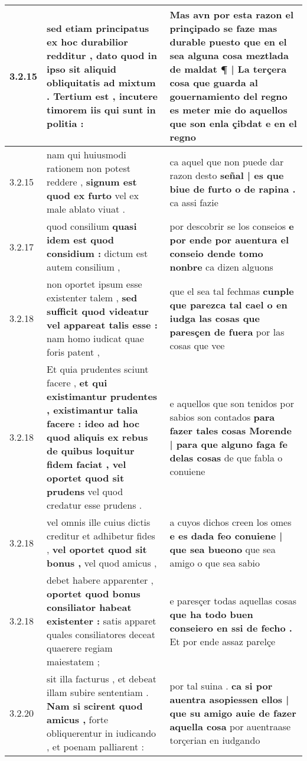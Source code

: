 \begin{tabular}{|p{1cm}|p{6.5cm}|p{6.5cm}|}
3.2.15 & sed etiam principatus ex hoc durabilior redditur , \textbf{ dato quod in ipso sit aliquid obliquitatis ad mixtum . Tertium est , } incutere timorem iis qui sunt in politia : & Mas avn por esta razon el prinçipado se faze mas durable \textbf{ puesto que en el sea alguna cosa meztlada de maldat ¶ | La terçera cosa } que guarda al gouernamiento del regno es meter mie do aquellos que son enla çibdat e en el regno \\\hline
3.2.15 & nam qui huiusmodi rationem non potest reddere , \textbf{ signum est quod ex furto } vel ex male ablato viuat . & ca aquel que non puede dar razon desto \textbf{ señal | es que biue de furto o de rapina . } ca assi fazie \\\hline
3.2.17 & quod consilium \textbf{ quasi idem est quod considium : } dictum est autem consilium , & por descobrir se los conseios \textbf{ e por ende por auentura el conseio dende tomo nonbre } ca dizen alguons \\\hline
3.2.18 & non oportet ipsum esse existenter talem , \textbf{ sed sufficit quod videatur vel appareat talis esse : } nam homo iudicat quae foris patent , & que el sea tal fechmas \textbf{ cunple que parezca tal cael o en iudga las cosas que paresçen de fuera } por las cosas que vee \\\hline
3.2.18 & Et quia prudentes sciunt facere , \textbf{ et qui existimantur prudentes , existimantur talia facere : ideo ad hoc quod aliquis ex rebus de quibus loquitur fidem faciat , vel oportet quod sit prudens } vel quod credatur esse prudens . & e aquellos que son tenidos por sabios son contados \textbf{ para fazer tales cosas Morende | para que alguno faga fe delas cosas } de que fabla o conuiene \\\hline
3.2.18 & vel omnis ille cuius dictis creditur et adhibetur fides , \textbf{ vel oportet quod sit bonus , } vel quod amicus , & a cuyos dichos creen los omes \textbf{ e es dada feo conuiene | que sea bueono } que sea amigo o que sea sabio \\\hline
3.2.18 & debet habere apparenter , \textbf{ oportet quod bonus consiliator habeat existenter : } satis apparet quales consiliatores deceat quaerere regiam maiestatem ; & e paresçer todas aquellas cosas \textbf{ que ha todo buen conseiero en ssi de fecho . } Et por ende assaz parelçe \\\hline
3.2.20 & sit illa facturus , et debeat illam subire sententiam . \textbf{ Nam si scirent quod amicus , } forte obliquerentur in iudicando , et poenam palliarent : & por tal suina . \textbf{ ca si por auentra asopiessen ellos | que su amigo auie de fazer aquella cosa } por auentraase torçerian en iudgando \\\hline

\end{tabular}
